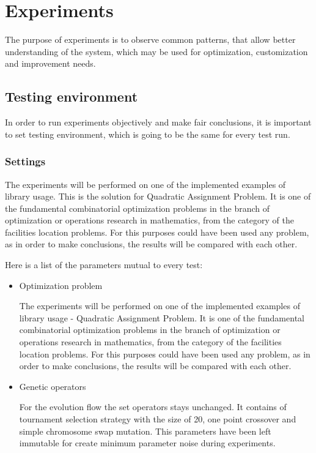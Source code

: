 \chapter{Experiments}

The purpose of experiments is to observe common patterns, that allow better understanding of the system, which may be used for optimization, customization and improvement needs.

\section{Testing environment}

In order to run experiments objectively and make fair conclusions, it is important to set testing environment, which is going to be the same for every test run.

\subsection{Settings}

The experiments will be performed on one of the implemented examples of library usage. This is the solution for Quadratic Assignment Problem. It is one of the fundamental combinatorial optimization problems in the branch of optimization or operations research in mathematics, from the category of the facilities location problems. For this purposes could have been used any problem, as in order to make conclusions, the results will be compared with each other.

Here is a list of the parameters mutual to every test:
\begin{itemize}

\item Optimization problem

The experiments will be performed on one of the implemented examples of library usage -  Quadratic Assignment Problem. It is one of the fundamental combinatorial optimization problems in the branch of optimization or operations research in mathematics, from the category of the facilities location problems. For this purposes could have been used any problem, as in order to make conclusions, the results will be compared with each other.


\item Genetic operators

For the evolution flow the set operators stays unchanged. It contains of tournament selection strategy with the size of 20, one point crossover and simple chromosome swap mutation. This parameters have been left immutable for create minimum parameter noise during experiments.

\end{itemize}

